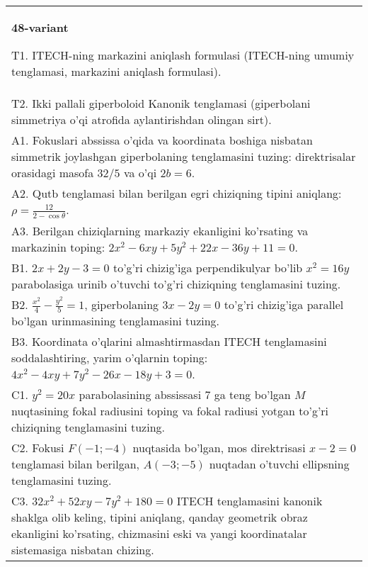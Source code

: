 \documentclass{article}
\begin{document}
\begin{tabular}{m{17cm}}
\textbf{48-variant}
\newline

T1. ITECH-ning markazini aniqlash formulasi (ITECH-ning umumiy tenglamasi, markazini aniqlash formulasi).\\

T2. Ikki pallali giperboloid Kanonik tenglamasi (giperbolani simmetriya o'qi atrofida aylantirishdan olingan sirt).\\

A1. Fokuslari abssissa o'qida va koordinata boshiga nisbatan simmetrik joylashgan giperbolaning tenglamasini tuzing: direktrisalar orasidagi masofa $32/5$ va o'qi $2b=6$.\\

A2. Qutb tenglamasi bilan berilgan egri chiziqning tipini aniqlang: $\rho=\frac{12}{2-\cos\theta}$.\\

A3. Berilgan chiziqlarning markaziy ekanligini ko'rsating va markazinin toping: $2x^{2}-6xy+5y^{2}+22x-36y+11=0$.\\

B1. $2x + 2y - 3 = 0$ to'g'ri chizig'iga perpendikulyar bo'lib $x^{2} = 16y$ parabolasiga urinib o'tuvchi to'g'ri chiziqning tenglamasini tuzing.  \\

B2. $\frac{x^{2}}{4} - \frac{y^{2}}{5} = 1$, giperbolaning $3x - 2y = 0$ to'g'ri chizig'iga parallel bo'lgan urinmasining tenglamasini tuzing.  \\

B3. Koordinata o'qlarini almashtirmasdan ITECH tenglamasini soddalashtiring, yarim o'qlarnin toping: $4x^{2} - 4xy + 7y^{2} - 26x - 18y + 3 = 0$.\\

C1. $y^{2} = 20x$ parabolasining abssissasi 7 ga teng bo'lgan $M$ nuqtasining fokal radiusini toping va fokal radiusi yotgan to'g'ri chiziqning tenglamasini tuzing.  \\

C2. Fokusi $F( - 1; - 4)$ nuqtasida bo'lgan, mos direktrisasi $x - 2 = 0$ tenglamasi bilan berilgan, $A( - 3; - 5)$ nuqtadan o'tuvchi ellipsning tenglamasini tuzing.  \\

C3. $32x^{2} + 52xy - 7y^{2} + 180 = 0$ ITECH tenglamasini kanonik shaklga olib keling, tipini aniqlang, qanday geometrik obraz ekanligini ko'rsating, chizmasini eski va yangi koordinatalar sistemasiga nisbatan chizing.  \\

\end{tabular}
\vspace{1cm}
\end{document}
